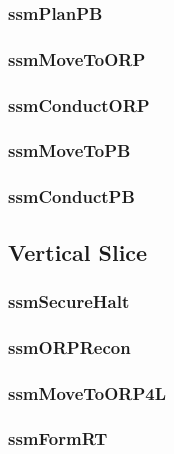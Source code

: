 \documentclass[../../main/main.tex]{subfiles}
\begin{document}
\subsubsection{ssmPlanPB}

\subsubsection{ssmMoveToORP}

\subsubsection{ssmConductORP}

\subsubsection{ssmMoveToPB}

\subsubsection{ssmConductPB}

\subsection{Vertical Slice}

\subsubsection{ssmSecureHalt}

\subsubsection{ssmORPRecon}

\subsubsection{ssmMoveToORP4L}

\subsubsection{ssmFormRT}
\end{document}
